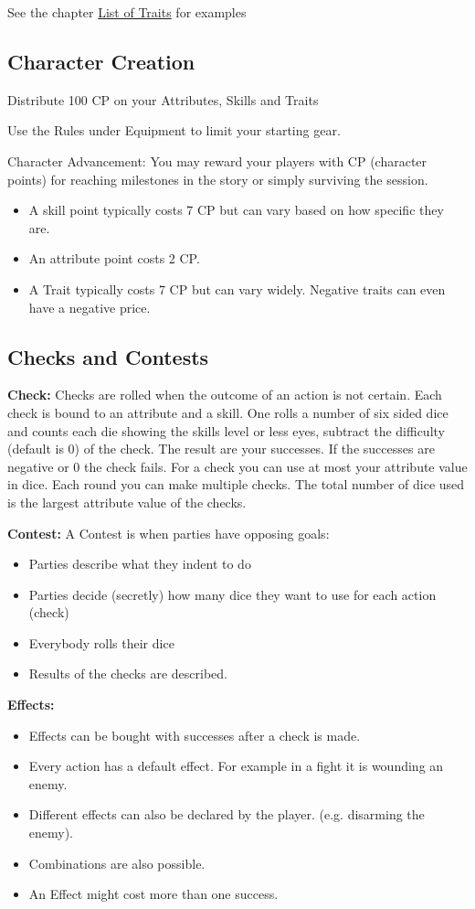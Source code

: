 \documentclass[11pt]{article}
\begin{document}
{\begin{multicols}{2}[]
See the chapter \hyperref[sec:orgbd0bea8]{List of Traits} for examples

\subsection{Character Creation}
\label{sec:orgdb9d35c}
Distribute 100 CP on your Attributes, Skills and Traits

Use the Rules under Equipment to limit your starting gear.

Character Advancement:
You may reward your players with CP (character points) for reaching milestones in the story or simply surviving the session.

\begin{itemize}
\item A skill point typically costs 7 CP but can vary based on how specific they are.
\item An attribute point costs 2 CP.
\item A Trait typically costs 7 CP but can vary widely. Negative traits can even have a negative price.
\end{itemize}

\subsection{Checks and Contests}
\label{sec:orgf6092f9}
\textbf{Check:}
Checks are rolled when the outcome of an action is not certain. Each check is bound to an attribute and a skill. One rolls a number of six sided dice and counts each die showing the skills level or less eyes, subtract the difficulty (default is 0) of the check. The result are your successes. If the successes are negative or 0 the check fails. For a check you can use at most your attribute value in dice.
Each round you can make multiple checks. The total number of dice used is the largest attribute value of the checks. 

\textbf{Contest:}
A Contest is when parties have opposing goals:
\begin{itemize}
\item Parties describe what they indent to do
\item Parties decide (secretly) how many dice they want to use for each action (check)
\item Everybody rolls their dice
\item Results of the checks are described.
\end{itemize}

\textbf{Effects:}
\begin{itemize}
\item Effects can be bought with successes after a check is made.
\item Every action has a default effect. For example in a fight it is wounding an enemy.
\item Different effects can also be declared by the player. (e.g. disarming the enemy).
\item Combinations are also possible.
\item An Effect might cost more than one success.
\end{itemize}


\end{multicols}}
\end{document}

